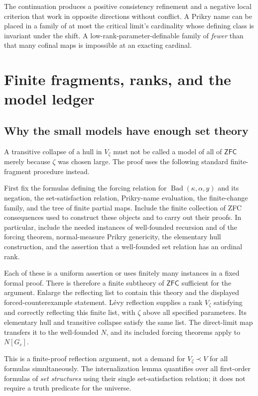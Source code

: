 \documentclass[11pt,letterpaper]{article}
\theoremstyle{definition}
\newcommand{\ZFC}{\mathsf{ZFC}}
\newcommand{\Bad}{\operatorname{Bad}}
\begin{document}
The continuation produces a positive consistency refinement and a
negative local criterion that work in opposite directions without
conflict. A Prikry name can be placed in a family of at most the critical
limit's cardinality whose defining class is invariant under the shift.
A low-rank-parameter-definable family of \emph{fewer} than that many
cofinal maps is impossible at an exacting cardinal.

\clearpage
\appendix
\section{Finite fragments, ranks, and the model ledger}\label{app:fragment}

\subsection{Why the small models have enough set theory}

A transitive collapse of a hull in $V_\zeta$ must not be called a model
of all of $\ZFC$ merely because $\zeta$ was chosen large. The proof uses
the following standard finite-fragment procedure instead.

First fix the formulas defining the forcing relation for
$\Bad(\kappa,\alpha,y)$ and its negation, the set-satisfaction relation,
Prikry-name evaluation, the finite-change family, and the tree of finite
partial maps. Include the finite collection of ZFC consequences used to
construct these objects and to carry out their proofs. In particular,
include the needed instances of well-founded recursion and of the
forcing theorem, normal-measure Prikry genericity, the elementary hull
construction, and the assertion that a well-founded set relation has
an ordinal rank.

Each of these is a uniform assertion or uses finitely many instances
in a fixed formal proof. There is therefore a finite subtheory of
$\ZFC$ sufficient for the argument. Enlarge the reflecting list to
contain this theory and the displayed forced-counterexample statement.
L\'evy reflection supplies a rank $V_\zeta$ satisfying and correctly
reflecting this finite list, with $\zeta$ above all specified parameters.
Its elementary hull and transitive collapse satisfy the same list.
The direct-limit map transfers it to the well-founded $N$, and its
included forcing theorems apply to $N[G_c]$.

This is a finite-proof reflection argument, not a demand for
$V_\zeta\prec V$ for all formulas simultaneously. The internalization
lemma quantifies over all first-order formulas of \emph{set structures}
using their single set-satisfaction relation; it does not require a
truth predicate for the universe.
\end{document}
